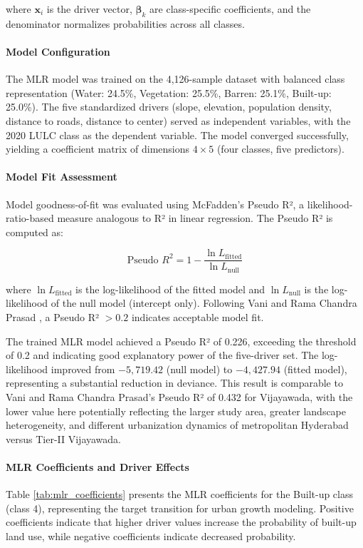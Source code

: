 \documentclass[conference]{IEEEtran}
\begin{document}
where $\mathbf{x}_i$ is the driver vector, $\boldsymbol{\beta}_k$ 
are class-specific coefficients, and the denominator normalizes 
probabilities across all classes.
\paragraph{Model Configuration}
The MLR model was trained on the 4,126-sample dataset with balanced class representation (Water: 24.5\%, Vegetation: 25.5\%, Barren: 25.1\%, Built-up: 25.0\%). The five standardized drivers (slope, elevation, population density, distance to roads, distance to center) served as independent variables, with the 2020 LULC class as the dependent variable. The model converged successfully, yielding a coefficient matrix of dimensions $4 \times 5$ (four classes, five predictors).

\paragraph{Model Fit Assessment}
Model goodness-of-fit was evaluated using McFadden's Pseudo R², a likelihood-ratio-based measure analogous to R² in linear regression. The Pseudo R² is computed as:

\begin{equation}
\text{Pseudo } R^2 = 1 - \frac{\ln L_{\text{fitted}}}{\ln L_{\text{null}}}
\label{eq:pseudo_r2}
\end{equation}

where $\ln L_{\text{fitted}}$ is the log-likelihood of the fitted model and $\ln L_{\text{null}}$ is the log-likelihood of the null model (intercept only). Following Vani and Rama Chandra Prasad \cite{vani2022}, a Pseudo R² $> 0.2$ indicates acceptable model fit.

The trained MLR model achieved a Pseudo R² of 0.226, exceeding the threshold of 0.2 and indicating good explanatory power of the five-driver set. The log-likelihood improved from $-5,719.42$ (null model) to $-4,427.94$ (fitted model), representing a substantial reduction in deviance. This result is comparable to Vani and Rama Chandra Prasad's \cite{vani2022} Pseudo R² of 0.432 for Vijayawada, with the lower value here potentially reflecting the larger study area, greater landscape heterogeneity, and different urbanization dynamics of metropolitan Hyderabad versus Tier-II Vijayawada.

\paragraph{MLR Coefficients and Driver Effects}
Table \ref{tab:mlr_coefficients} presents the MLR coefficients for the Built-up class (class 4), representing the target transition for urban growth modeling. Positive coefficients indicate that higher driver values increase the probability of built-up land use, while negative coefficients indicate decreased probability.
\end{document}
